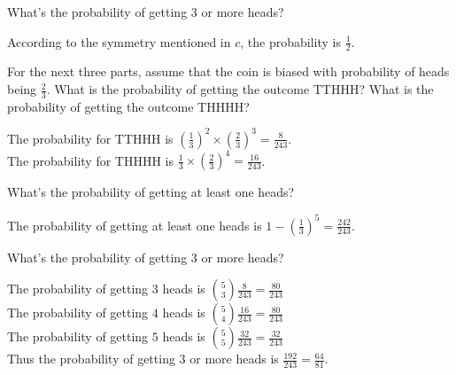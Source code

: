 \documentclass[11pt]{article}
\begin{document}
\begin{Parts}
    \Part What’s the probability of getting 3 or more heads?
    \begin{Answer}
        According to the symmetry mentioned in $c$, the probability is $\frac{1}{2}$. 
    \end{Answer}

    \newpage
    \Part For the next three parts, assume that the coin is biased with probability of heads being $\frac{2}{3}$. 
          What is the probability of getting the outcome TTHHH? What is the probability of getting the outcome THHHH?
    \begin{Answer}
        The probability for TTHHH is $(\frac{1}{3})^2 \times (\frac{2}{3})^3 = \frac{8}{243}$. \\
        The probability for THHHH is $\frac{1}{3} \times (\frac{2}{3})^4 = \frac{16}{243}$.  
    \end{Answer}
    
    \Part What’s the probability of getting at least one heads?
    \begin{Answer}
        The probability of getting at least one heads is $1 - (\frac{1}{3})^5 = \frac{242}{243}$. 
    \end{Answer}

    \Part What’s the probability of getting 3 or more heads?
    \begin{Answer}
        The probability of getting $3$ heads is ${5 \choose 3}\frac{8}{243} = \frac{80}{243}$  \\
        The probability of getting $4$ heads is ${5 \choose 4}\frac{16}{243} = \frac{80}{243}$ \\
        The probability of getting $5$ heads is ${5 \choose 5}\frac{32}{243} = \frac{32}{243}$ \\
        Thus the probability of getting 3 or more heads is $\frac{192}{243} = \frac{64}{81}$. 
    \end{Answer}

\end{Parts}

\newpage
{}
\end{document}
